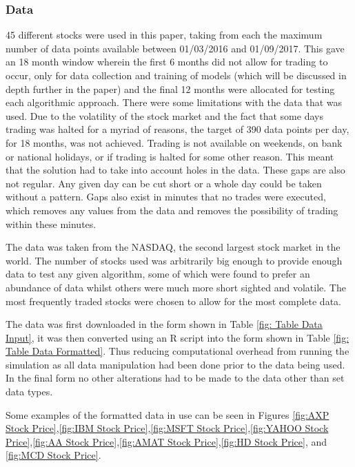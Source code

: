 \documentclass[conference]{IEEEtran}
\begin{document}
\subsubsection{Data}

45 different stocks were used in this paper, taking from each the maximum number of data points available between 01/03/2016 and 01/09/2017. This gave an 18 month window wherein the first 6 months did not allow for trading to occur, only for data collection and training of models (which will be discussed in depth further in the paper) and the final 12 months were allocated for testing each algorithmic approach. There were some limitations with the data that was used. Due to the volatility of the stock market and the fact that some days trading was halted for a myriad of reasons, the target of 390 data points per day, for 18 months, was not achieved. Trading is not available on weekends, on bank or national holidays, or if trading is halted for some other reason. This meant that the solution had to take into account holes in the data. These gaps are also not regular. Any given day can be cut short or a whole day could be taken without a pattern. Gaps also exist in minutes that no trades were executed, which removes any values from the data and removes the possibility of trading within these minutes.

The data was taken from the NASDAQ, the second largest stock market in the world. The number of stocks used was arbitrarily big enough to provide enough data to test any given algorithm, some of which were found to prefer an abundance of data whilst others were much more short sighted and volatile. The most frequently traded stocks were chosen to allow for the most complete data.

The data was first downloaded in the form shown in Table \ref{fig: Table Data Input}, it was then converted using an R script into the form shown in Table \ref{fig: Table Data Formatted}. Thus reducing computational overhead from running the simulation as all data manipulation had been done prior to the data being used. In the final form no other alterations had to be made to the data other than set data types. 

Some examples of the formatted data in use can be seen in Figures  \ref{fig:AXP Stock Price},\ref{fig:IBM Stock Price},\ref{fig:MSFT Stock Price},\ref{fig:YAHOO Stock Price},\ref{fig:AA Stock Price},\ref{fig:AMAT Stock Price},\ref{fig:HD Stock Price}, and \ref{fig:MCD Stock Price}.
\end{document}
